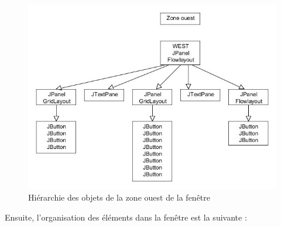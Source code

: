 \documentclass[12pt, a4paper]{article}
\begin{document}
\begin{figure}[!h]
\begin{center}
   \includegraphics[scale = 0.7]{arbre_jframe_ouest.jpg}
	\caption{Hiérarchie des objets de la zone ouest de la fenêtre}
	\end{center}
\end{figure}
\newpage
Ensuite, l'organisation des éléments dans la fenêtre est la suivante :
\end{document}

